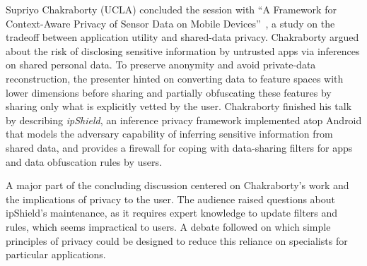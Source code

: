 Supriyo Chakraborty (UCLA) concluded the session with ``A
Framework for Context-Aware Privacy of Sensor Data on Mobile
Devices''~\cite{chakraborty13},
a study on the tradeoff between application utility and shared-data
privacy. Chakraborty argued about the risk of disclosing sensitive
information by untrusted apps via inferences on shared personal
data. To preserve anonymity and avoid private-data reconstruction, the
presenter hinted on converting data to feature spaces with lower
dimensions before sharing and partially obfuscating these features by
sharing only what is explicitly vetted by the user. Chakraborty finished
his talk by describing \emph{ipShield}, an inference privacy framework
implemented atop Android that models the adversary capability of
inferring sensitive information from shared data, and provides a
firewall for coping with data-sharing filters for apps and data
obfuscation rules by users.

A major part of the concluding discussion centered on Chakraborty's work and
the implications of privacy to the user. The audience raised questions
about ipShield's maintenance, as it requires expert knowledge to update
filters and rules, which seems impractical to users. A debate followed
on which simple principles of privacy could be designed to reduce this
reliance on specialists for particular applications.
